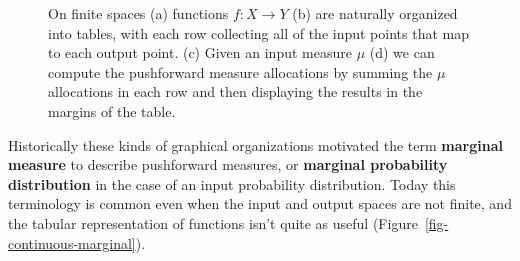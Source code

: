 \documentclass[
  letterpaper,
  DIV=11,
  numbers=noendperiod]{scrartcl}
\begin{document}
\begin{figure}
\begin{minipage}[t]{0.50\linewidth}
{{}

}

\subcaption{\label{fig-finite-marginal-initial-allocations}}
\end{minipage}%
%
\begin{minipage}[t]{0.50\linewidth}

{\centering 


}

\subcaption{\label{fig-finite-marginal-marginal-allocations}}
\end{minipage}%

\caption{\label{fig-finite-marginal}On finite spaces (a) functions
\(f: X \rightarrow Y\) (b) are naturally organized into tables, with
each row collecting all of the input points that map to each output
point. (c) Given an input measure \(\mu\) (d) we can compute the
pushforward measure allocations by summing the \(\mu\) allocations in
each row and then displaying the results in the margins of the table.}

\end{figure}

Historically these kinds of graphical organizations motivated the term
\textbf{marginal measure} to describe pushforward measures, or
\textbf{marginal probability distribution} in the case of an input
probability distribution. Today this terminology is common even when the
input and output spaces are not finite, and the tabular representation
of functions isn't quite as useful
(Figure~\ref{fig-continuous-marginal}).
\end{document}
